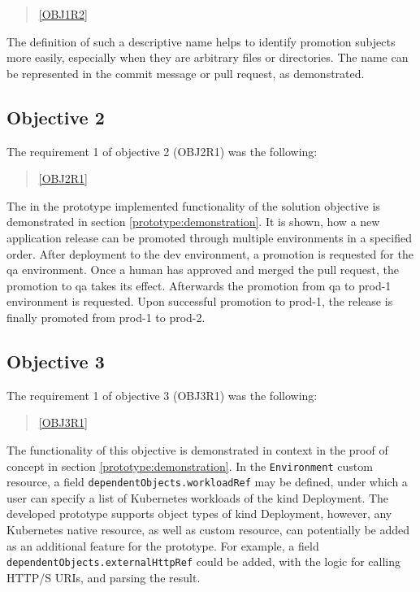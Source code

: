 \begin{quotation}
	\noindent
	\ref{OBJ1R2}
\end{quotation}

The definition of such a descriptive name helps to identify promotion subjects more easily, especially when
they are arbitrary files or directories. The name can be represented in the commit message or pull request, as demonstrated.

\subsection*{Objective 2}

The requirement 1 of objective 2 (OBJ2R1) was the following:

\begin{quotation}
	\noindent
	\ref{OBJ2R1}
\end{quotation}

The in the prototype implemented functionality of the solution objective is demonstrated in section
\ref{prototype:demonstration}.
It is shown, how a new application release can be promoted through multiple environments in a specified order.
After deployment to the dev environment, a promotion is requested for the qa environment.
Once a human has approved and merged the pull request, the promotion to qa takes its effect.
Afterwards the promotion from qa to prod-1 environment is requested. Upon successful promotion to prod-1,
the release is finally promoted from prod-1 to prod-2.

\subsection*{Objective 3}

The requirement 1 of objective 3 (OBJ3R1) was the following:

\begin{quotation}
	\noindent
	\ref{OBJ3R1}
\end{quotation}

The functionality of this objective is demonstrated in context in the proof of concept
in section \ref{prototype:demonstration}.
In the \lstinline|Environment| custom resource,
a field \lstinline|dependentObjects.workloadRef| may be defined, under which a user can specify
a list of Kubernetes workloads of the kind Deployment.
The developed prototype supports object types of kind Deployment,
however, any Kubernetes native resource, as well as custom resource, can potentially be added as an
additional feature for the prototype.
For example, a field \lstinline|dependentObjects.externalHttpRef| could be added,
with the logic for calling HTTP/S URIs, and parsing the result.

